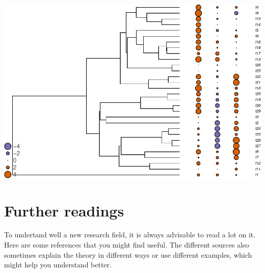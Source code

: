 \documentclass[
]{book}
\begin{document}
\begin{center}\includegraphics{pcm-workshop_files/figure-latex/PlotContinuousParameter_tablephylo4d-1} \end{center}

\hypertarget{further-readings}{%
\chapter{Further readings}\label{further-readings}}

To undertand well a new research field, it is always advisable to read a lot on it. Here are some references that you might find useful. The different sources also sometimes explain the theory in different ways or use different examples, which might help you understand better.
\end{document}
